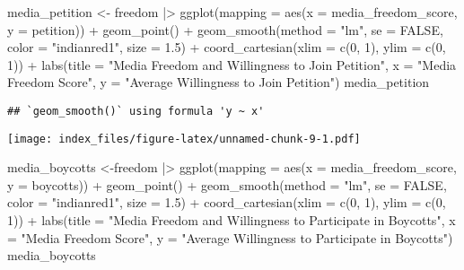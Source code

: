 \documentclass[
]{article}
\newenvironment{Shaded}{\begin{snugshade}}{\end{snugshade}}
\newcommand{\AttributeTok}[1]{\textcolor[rgb]{0.77,0.63,0.00}{#1}}
\newcommand{\ConstantTok}[1]{\textcolor[rgb]{0.00,0.00,0.00}{#1}}
\newcommand{\DecValTok}[1]{\textcolor[rgb]{0.00,0.00,0.81}{#1}}
\newcommand{\FloatTok}[1]{\textcolor[rgb]{0.00,0.00,0.81}{#1}}
\newcommand{\FunctionTok}[1]{\textcolor[rgb]{0.00,0.00,0.00}{#1}}
\newcommand{\NormalTok}[1]{#1}
\newcommand{\OtherTok}[1]{\textcolor[rgb]{0.56,0.35,0.01}{#1}}
\newcommand{\SpecialCharTok}[1]{\textcolor[rgb]{0.00,0.00,0.00}{#1}}
\newcommand{\StringTok}[1]{\textcolor[rgb]{0.31,0.60,0.02}{#1}}
\begin{document}
\begin{Shaded}
\begin{Highlighting}[]
\NormalTok{media\_petition }\OtherTok{\textless{}{-}}\NormalTok{ freedom }\SpecialCharTok{|\textgreater{}}
  \FunctionTok{ggplot}\NormalTok{(}\AttributeTok{mapping =} \FunctionTok{aes}\NormalTok{(}\AttributeTok{x =}\NormalTok{ media\_freedom\_score,}
         \AttributeTok{y =}\NormalTok{ petition)) }\SpecialCharTok{+}
  \FunctionTok{geom\_point}\NormalTok{() }\SpecialCharTok{+} 
  \FunctionTok{geom\_smooth}\NormalTok{(}\AttributeTok{method =} \StringTok{"lm"}\NormalTok{, }\AttributeTok{se =} \ConstantTok{FALSE}\NormalTok{, }\AttributeTok{color =} \StringTok{"indianred1"}\NormalTok{, }\AttributeTok{size =} \FloatTok{1.5}\NormalTok{) }\SpecialCharTok{+}
  \FunctionTok{coord\_cartesian}\NormalTok{(}\AttributeTok{xlim =} \FunctionTok{c}\NormalTok{(}\DecValTok{0}\NormalTok{, }\DecValTok{1}\NormalTok{), }\AttributeTok{ylim =} \FunctionTok{c}\NormalTok{(}\DecValTok{0}\NormalTok{, }\DecValTok{1}\NormalTok{)) }\SpecialCharTok{+}
  \FunctionTok{labs}\NormalTok{(}\AttributeTok{title =} \StringTok{"Media Freedom and Willingness to Join Petition"}\NormalTok{,}
       \AttributeTok{x =} \StringTok{"Media Freedom Score"}\NormalTok{,}
       \AttributeTok{y =} \StringTok{"Average Willingness to Join Petition"}\NormalTok{)}
\NormalTok{media\_petition}
\end{Highlighting}
\end{Shaded}

\begin{verbatim}
## `geom_smooth()` using formula 'y ~ x'
\end{verbatim}

\texttt{[image: index\_files/figure-latex/unnamed-chunk-9-1.pdf]}

\begin{Shaded}
\begin{Highlighting}[]
\NormalTok{media\_boycotts }\OtherTok{\textless{}{-}}\NormalTok{freedom }\SpecialCharTok{|\textgreater{}}
  \FunctionTok{ggplot}\NormalTok{(}\AttributeTok{mapping =} \FunctionTok{aes}\NormalTok{(}\AttributeTok{x =}\NormalTok{ media\_freedom\_score,}
         \AttributeTok{y =}\NormalTok{ boycotts)) }\SpecialCharTok{+}
  \FunctionTok{geom\_point}\NormalTok{() }\SpecialCharTok{+} 
  \FunctionTok{geom\_smooth}\NormalTok{(}\AttributeTok{method =} \StringTok{"lm"}\NormalTok{, }\AttributeTok{se =} \ConstantTok{FALSE}\NormalTok{, }\AttributeTok{color =} \StringTok{"indianred1"}\NormalTok{, }\AttributeTok{size =} \FloatTok{1.5}\NormalTok{) }\SpecialCharTok{+}
  \FunctionTok{coord\_cartesian}\NormalTok{(}\AttributeTok{xlim =} \FunctionTok{c}\NormalTok{(}\DecValTok{0}\NormalTok{, }\DecValTok{1}\NormalTok{), }\AttributeTok{ylim =} \FunctionTok{c}\NormalTok{(}\DecValTok{0}\NormalTok{, }\DecValTok{1}\NormalTok{)) }\SpecialCharTok{+}
  \FunctionTok{labs}\NormalTok{(}\AttributeTok{title =} \StringTok{"Media Freedom and Willingness to Participate in Boycotts"}\NormalTok{,}
       \AttributeTok{x =} \StringTok{"Media Freedom Score"}\NormalTok{,}
       \AttributeTok{y =} \StringTok{"Average Willingness to Participate in Boycotts"}\NormalTok{)}
\NormalTok{media\_boycotts}
\end{Highlighting}
\end{Shaded}
\end{document}
